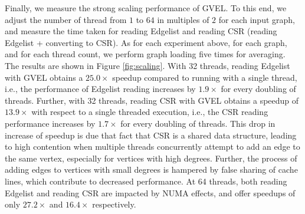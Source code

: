 Finally, we measure the strong scaling performance of GVEL. To this end, we adjust the number of thread from $1$ to $64$ in multiples of $2$ for each input graph, and measure the time taken for reading Edgelist and reading CSR (reading Edgelist + converting to CSR). As for each experiment above, for each graph, and for each thread count, we perform graph loading five times for averaging. The results are shown in Figure \ref{fig:scaling}. With 32 threads, reading Edgelist with GVEL obtains a $25.0\times$ speedup compared to running with a single thread, i.e., the performance of Edgelist reading increases by $1.9\times$ for every doubling of threads. Further, with 32 threads, reading CSR with GVEL obtains a speedup of $13.9\times$ with respect to a single threaded execution, i.e., the CSR reading performance increases by $1.7\times$ for every doubling of threads. This drop in increase of speedup is due that fact that CSR is a shared data structure, leading to high contention when multiple threads concurrently attempt to add an edge to the same vertex, especially for vertices with high degrees. Further, the process of adding edges to vertices with small degrees is hampered by false sharing of cache lines, which contribute to decreased performance. At 64 threads, both reading Edgelist and reading CSR are impacted by NUMA effects, and offer speedups of only $27.2\times$ and $16.4\times$ respectively.














